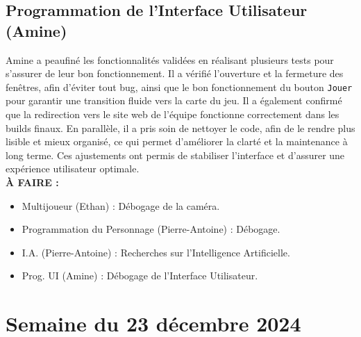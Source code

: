 \documentclass{report}
\begin{document}
\subsection*{Programmation de l'Interface Utilisateur (Amine)}
Amine a peaufiné les fonctionnalités validées en réalisant plusieurs tests pour s’assurer de leur bon fonctionnement. Il a vérifié l’ouverture et la fermeture des fenêtres, afin d’éviter tout bug, ainsi que le bon fonctionnement du bouton \texttt{Jouer} pour garantir une transition fluide vers la carte du jeu. Il a également confirmé que la redirection vers le site web de l’équipe fonctionne correctement dans les builds finaux. En parallèle, il a pris soin de nettoyer le code, afin de le rendre plus lisible et mieux organisé, ce qui permet d’améliorer la clarté et la maintenance à long terme. Ces ajustements ont permis de stabiliser l’interface et d’assurer une expérience utilisateur optimale.
\\[1cm]
\textbf{À FAIRE :}
\begin{itemize}
    \item Multijoueur (Ethan) : Débogage de la caméra.
    \item Programmation du Personnage (Pierre-Antoine) : Débogage.
    \item I.A. (Pierre-Antoine) : Recherches sur l'Intelligence Artificielle.
    \item Prog. UI (Amine) : Débogage de l'Interface Utilisateur.
\end{itemize}






\newpage
\section{Semaine du 23 décembre 2024}
\end{document}
